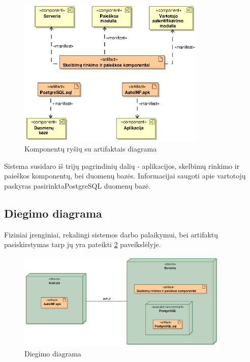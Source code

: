 \documentclass[12pt]{article}
\begin{document}
	\begin{figure}[h]
		\begin{center}
			\includegraphics[width=0.8\textwidth]{ArtifaktaiKomponentai.eps}
			\caption{Komponentų ryšių su artifaktais diagrama\label{ArtComp}}
		\end{center}
	\end{figure}

	\begin{indent}
	Sistema susidaro iš trijų pagrindinių dalių - aplikacijos, skelbimų rinkimo ir paieškos komponentų, bei duomenų bazės. Informacijai saugoti apie vartotojų paskyras pasirinkta\break PostgreSQL duomenų bazė.
	\end{indent}
	\pagebreak
	
	\subsection{Diegimo diagrama}
	
	 Fiziniai įrenginiai, rekalingi sistemos darbo palaikymui, bei artifaktų pasiskirstymas tarp jų yra pateikti \ref{Cube} paveikslėlyje. \\
	
	\begin{figure}[h]
		\begin{center}
			\includegraphics[width=0.9\textwidth]{Mazgai.eps}
			\caption{Diegimo diagrama\label{Cube}}
		\end{center}
	\end{figure}
	
\end{document}
